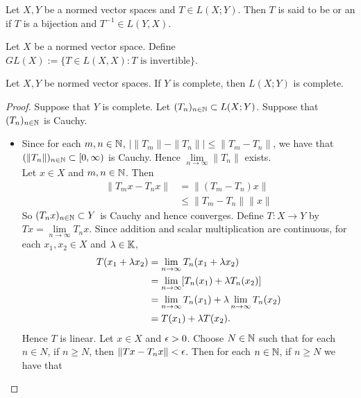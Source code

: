 \documentclass{book}
\begin{document}
	\begin{defn} 
		Let $X,Y$ be a normed vector spaces and $T \in L(X; Y)$. Then $T$ is said to be  or an  if $T$ is a bijection and $T^{-1} \in L(Y,X)$.
	\end{defn}
	
	\begin{defn} 
		Let $X$ be a normed vector space. Define $GL(X) := \{T \in L(X,X): T \text{ is invertible}\}$.
	\end{defn}
	
	\begin{ex} 
		Let $X,Y$ be normed vector spaces. If $Y$ is complete, then $L(X; Y)$ is complete.
	\end{ex}
	
	\begin{proof}
		Suppose that $Y$ is complete. Let $(T_n)_{n \in \mathbb{N}} \subset L(X; Y)$. Suppose that $(T_n)_{n \in \mathbb{N}}$ is Cauchy.
		\begin{itemize}
			\item Since for each $m,n \in \mathbb{N}$, $\big\vert \|T_m \|- \|T_n \|\big\vert \leq \|T_m -T_n \|$, we have that $(\|T_n \|)_{n \in \mathbb{N}} \subset [0,\infty)$ is Cauchy. Hence $\lim\limits_{n \rightarrow \infty}\|T_n \|$ exists. \vspace{1cm} \\ Let $x \in X$ and $m,n \in \mathbb{N}$. Then 
			\begin{align*}
				\|T_m x - T_n x \|
				&= \|(T_m-T_n) x \|\\
				&\leq \|T_m-T_n \|\|x \|
			\end{align*}
			So $(T_nx)_{n \in \mathbb{N}} \subset Y$ is Cauchy and hence converges. Define $T:X \rightarrow Y$ by $Tx = \lim\limits_{n \rightarrow \infty} T_nx$. Since addition and scalar multiplication are continuous, for each $x_1, x_2 \in X$ and $\lambda \in \mathbb{K}$, 
			\begin{align*}
				T(x_1+\lambda x_2) 
				& = \lim_{n \rightarrow \infty} T_n(x_1 + \lambda x_2) \\
				& =  \lim_{n \rightarrow \infty} [T_n(x_1) + \lambda T_n(x_2) ]\\
				& = \lim_{n \rightarrow \infty} T_n(x_1) + \lambda \lim_{n \rightarrow \infty} T_n(x_2) \\
				& = T(x_1) + \lambda T(x_2).
			\end{align*}
			Hence $T$ is linear. Let $x \in X$ and $\epsilon>0$. Choose $N \in \mathbb{N}$ such that for each $n \in N$, if $n \geq N$, then $\|Tx - T_n x\|< \epsilon$. Then for each $n \in \mathbb{N}$, if $n \geq N$ we have that 

\end{itemize}
\end{proof}
\end{document}
